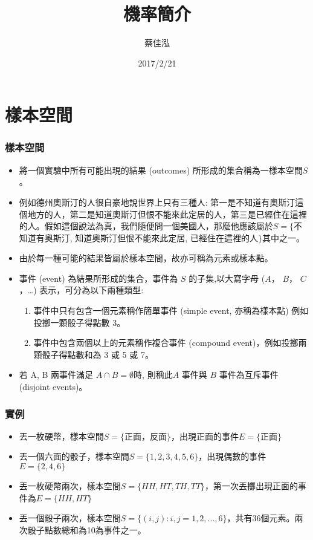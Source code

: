 \documentclass{beamer}
\author[蔡佳泓]{蔡佳泓}
\title[Statistical Methods for Social Sciences]{機率簡介}
\date{2017/2/21} %
\institute[]{國立政治大學東亞所暨選舉研究中心}
\begin{document}
\maketitle
\tableofcontents
\section{樣本空間}
\begin{frame}\frametitle{樣本空間}
\begin{itemize}
\item 將一個實驗中所有可能出現的結果 (outcomes) 所形成的集合稱為一樣本空間$S$。
\item 例如德州奧斯汀的人很自豪地說世界上只有三種人: 第一是不知道有奧斯汀這個地方的人，第二是知道奧斯汀但恨不能來此定居的人，第三是已經住在這裡的人。假如這個說法為真，我們隨便問一個美國人，那麼他應該屬於$S=\{$不知道有奧斯汀, 知道奧斯汀但恨不能來此定居, 已經住在這裡的人$\}$其中之一。
\item 由於每一種可能的結果皆屬於樣本空間，故亦可稱為元素或樣本點。
\item 事件 (event) 為結果所形成的集合，事件為 $S$ 的子集,以大寫字母 ($A$， $B$， $C$，\ldots) 表示，可分為以下兩種類型:
\begin{enumerate}
\item 事件中只有包含一個元素稱作簡單事件 (simple event, 亦稱為樣本點) 例如投擲一顆骰子得點數 3。
\item 事件中包含兩個以上的元素稱作複合事件 (compound event)，例如投擲兩顆骰子得點數和為 3 或 5 或 7。
\end{enumerate}
\item 若 A, B 兩事件滿足 $A \cap B = \emptyset $時, 則稱此$A$ 事件與 $B$ 事件為互斥事件 (disjoint events)。
\end{itemize}
\end{frame}
\begin{frame}\frametitle{實例}
\begin{itemize}
\item 丟一枚硬幣，樣本空間$S=\{$正面，反面$\}$，出現正面的事件$E=\{$正面$\}$
\item 丟一個六面的骰子，樣本空間$S=\{1,2,3,4,5,6\}$，出現偶數的事件$E=\{2,4,6\}$
\item 丟一枚硬幣兩次，樣本空間$S=\{HH, HT, TH, TT\}$，第一次丟擲出現正面的事件為$E=\{HH, HT\}$
\item 丟一個骰子兩次，樣本空間$S=\{(i,j):i,j=1,2,\ldots,6\}$，共有36個元素。兩次骰子點數總和為10為事件之一。
\end{itemize}
\end{frame}
\end{document}
